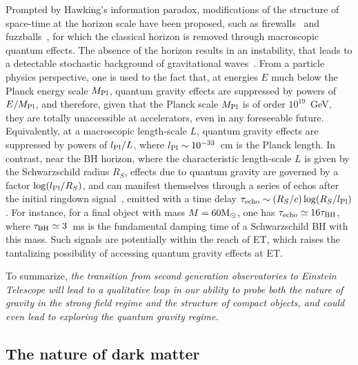 Prompted by Hawking's 
information paradox, modifications of the structure of space-time at the horizon scale have been proposed, such as firewalls~\cite{Almheiri:2012rt} and fuzzballs~\cite{Mathur:2005zp}, for which the classical horizon is removed through macroscopic quantum effects. The absence of the horizon results in an instability, that leads to a detectable stochastic background of gravitational waves~\cite{Barausse:2018vdb}.
From a particle physics perspective, one is used to the fact that, at energies $E$ much below the Planck energy scale $M_{\rm Pl}$, quantum gravity effects are suppressed by powers of 
$E/M_{\rm Pl}$, and therefore, given that  the Planck scale $M_{\rm Pl}$ is of order $10^{19}$~GeV, they are totally unaccessible at accelerators, even in any foreseeable future. Equivalently, at a macroscopic length-scale $L$, quantum gravity effects are suppressed by powers of $l_{\rm Pl}/L$, where $l_{\rm Pl}\sim 10^{-33}$~cm is the Planck length. In contrast, near the BH horizon, where the characteristic length-scale $L$ is given by the Schwarzschild radius $R_S$, effects due to quantum gravity  are governed  by a factor  $\log (l_{\rm Pl}/R_S)$, and can manifest themselves  through a series of echos after the initial ringdown signal~\cite{Cardoso:2016rao,Cardoso:2016oxy,Cardoso:2019apo}, emitted with a time delay  $\tau_{\rm echo}\sim (R_S/c) \log (R_S/l_{\rm Pl})$. For instance, for a final object with mass $M=60\mathrm{M}_{\odot}$, one has 
$\tau_{\rm echo}\simeq 16\tau_{\rm BH}$, where $\tau_{\rm BH}\simeq 3$~ms is the fundamental damping time of a Schwarzschild BH with this mass. Such signals 
 are potentially within the reach of ET, which raises the tantalizing possibility of accessing 
quantum gravity effects at ET.

\vspace{1mm}
To summarize, {\em the transition from second generation observatories to Einstein Telescope
will lead to a qualitative leap in our ability to probe both the nature of gravity in the strong field regime 
and the structure of compact objects, and could even lead to exploring the quantum gravity regime.} 


\subsection{The nature of dark matter}

